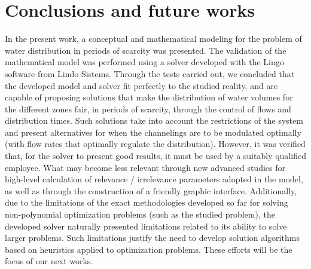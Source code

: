\documentclass{singlecol}
\theoremstyle{TH}{
\newtheorem{lemma}{Lemma}
\newtheorem{theorem}[lemma]{Theorem}
\newtheorem{corrolary}[lemma]{Corrolary}
\newtheorem{conjecture}[lemma]{Conjecture}
\newtheorem{proposition}[lemma]{Proposition}
\newtheorem{claim}[lemma]{Claim}
\newtheorem{stheorem}[lemma]{Wrong Theorem}
\newtheorem{algorithm}{Algorithm}
}
\theoremstyle{THrm}{
\newtheorem{definition}{Definition}[section]
\newtheorem{question}{Question}[section]
\newtheorem{remark}{Remark}
\newtheorem{scheme}{Scheme}
}
\theoremstyle{THhit}{
\newtheorem{case}{Case}[section]
}
\begin{document}
\section{Conclusions and future works}
\label{sec:conclusions}

In the present work, a conceptual and mathematical modeling for the problem of water distribution in periods of scarcity was presented. The validation of the mathematical model was performed using a solver developed with the Lingo software from Lindo Sistems. Through the tests carried out, we concluded that the developed model and solver fit perfectly to the studied reality, and are capable of proposing solutions that make the distribution of water volumes for the different zones fair, in periods of scarcity, through the control of flows and distribution times. Such solutions take into account the restrictions of the system and present alternatives for when the channelings are to be modulated optimally (with flow rates that optimally regulate the distribution). However, it was verified that, for the solver to present good results, it must be used by a suitably qualified employee. What may become less relevant through new advanced studies for high-level calculation of relevance / irrelevance parameters adopted in the model, as well as through the construction of a friendly graphic interface.  Additionally, due to the limitations of the exact methodologies developed so far for solving non-polynomial optimization problems (such as the studied problem), the developed solver naturally presented limitations related to its ability to solve larger problems. Such limitations justify the need to develop solution algorithms based on heuristics applied to optimization problems. These efforts will be the focus of our next works.


\end{document}
